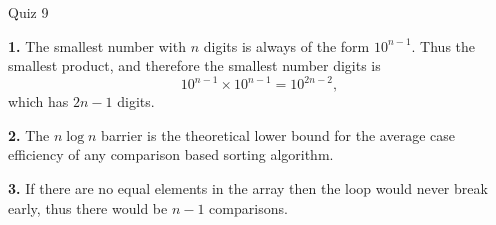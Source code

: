 \documentclass[letterpaper, 11pt]{article}
\newcommand{\hwnumber}[1]{\medskip \noindent\textbf{#1.} \smallskip}
\begin{document}
\begin{center}
	{\LARGE Quiz 9}\\
\end{center}

\hwnumber{1} The smallest number with \(n\) digits is always of the form
\(10^{n-1}\). Thus the smallest product, and therefore the smallest number
digits is 
\[10^{n-1} \times 10^{n-1} = 10^{2n-2},\]
which has \(2n-1\) digits.


\hwnumber{2} The \(n\log n\) barrier is the theoretical lower bound for the
average case efficiency of any comparison based sorting algorithm. 


\hwnumber{3} If there are no equal elements in the array then the loop would
never break early, thus there would be \(n - 1\) comparisons.
\end{document}

